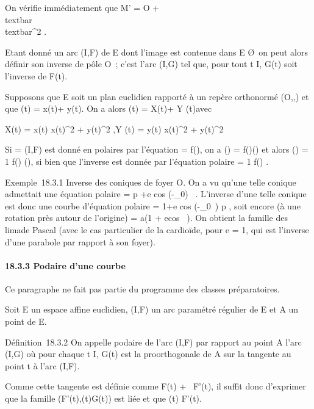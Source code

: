 \documentclass[]{article}
\begin{document}
On vérifie immédiatement que M' = O +
\overrightarrowOM \over
\\textbar{}\overrightarrowOM\\textbar{}^2
.

Etant donné un arc (I,F) de E dont l'image est contenue dans E
\diagdown\O\, on peut alors définir son
inverse de pôle O~; c'est l'arc (I,G) tel que, pour tout t \in I, G(t)
soit l'inverse de F(t).

Supposons que E soit un plan euclidien rapporté à un repère orthonormé
(O,\vec\imath,) et que
\overrightarrowOF(t) = x(t)\vec\imath +
y(t). On a alors
\overrightarrowOG(t) = X(t)\vec\imath +
Y (t) avec

X(t) = x(t) \over x(t)^2 +
y(t)^2 ,\quad Y (t) = y(t)
\over x(t)^2 + y(t)^2

Si \Gamma = (I,F) est donné en polaires par l'équation \rho = f(\theta), on a
\overrightarrowOF(\theta) =
f(\theta)\vecu(\theta) et alors
\overrightarrowOG(\theta) = 1 \over
f(\theta) \vecu(\theta), si bien que l'inverse est donnée par
l'équation polaire \rho = 1 \over f(\theta) .

Exemple~18.3.1 Inverse des coniques de foyer O. On a vu qu'une telle
conique admettait une équation polaire \rho = p +e cos (\theta-\theta\_0)~ . L'inverse d'une
telle conique est donc une courbe d'équation polaire \rho =
1+e cos (\theta-\theta\_0~) \over
p , soit encore (à une rotation près autour de l'origine) \rho = a(1 +
ecos~ \theta). On obtient la famille des
lima\ccons de Pascal (avec le cas particulier de la
cardioïde, pour e = 1, qui est l'inverse d'une parabole par rapport à
son foyer).

\paragraph{18.3.3 Podaire d'une courbe}

Ce paragraphe ne fait pas partie du programme des classes préparatoires.

Soit E un espace affine euclidien, (I,F) un arc paramétré régulier de E
et A un point de E.

Définition~18.3.2 On appelle podaire de l'arc (I,F) par rapport au point
A l'arc (I,G) où pour chaque t \in I, G(t) est la pro\jmathection orthogonale
de A sur la tangente au point t à l'arc (I,F).

Comme cette tangente est définie comme F(t) + ~F'(t), il suffit donc
d'exprimer que la famille
(F'(t),\overrightarrowF(t)G(t)) est liée et que
\overrightarrowAG(t) \bot F'(t).
\end{document}
